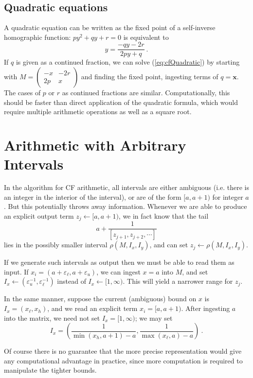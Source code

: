 \documentclass[11pt, oneside]{amsart}   	%
\renewcommand{\:}{\negthickspace:\negthickspace}
\begin{document}
\subsection{Quadratic equations}
A quadratic equation can be written as the fixed point of a self-inverse homographic function:
$
py^2 + qy + r = 0
$
is equivalent to
\begin{equation}\label{eq:cfQuadratic}
y = \frac{-qy - 2r}{2py + q}\ .
\end{equation}
If $q$ is given as a continued fraction, we can solve (\ref{eq:cfQuadratic}) by starting with $M= \left(
\begin{smallmatrix} 
-x & -2r \\ 
2p & x 
\end{smallmatrix}
\right)$ and finding the fixed point, ingesting terms of  $q=\mathbf{x}$. The cases of $p$ or $r$ as continued fractions are similar.
Computationally, this should be faster than direct application of the quadratic formula, which would require multiple arithmetic operations as well as a square root.


\section{Arithmetic with Arbitrary Intervals}
In the algorithm for CF arithmetic, all intervals are either ambiguous (i.e. there is an integer in the interior of the interval), or are of the form $[a,a+1)$ for integer $a$. But this potentially throws away information.
Whenever we are able to produce an explicit output term $z_j \leftarrow [a,a+1)$, we in fact know that the tail 
\[
a + \frac{1}{[z_{j+1}, z_{j+2},\cdots]}
\]
lies in the possibly smaller interval $\rho(M,I_x, I_y)$, and can set $z_j \leftarrow \rho(M,I_x, I_y)$.

If we generate such intervals as output then we must be able to read them as input. If $x_i = (a+\varepsilon_\ell, a+\varepsilon_u)$, we can ingest $x=a$ into $M$, and set $I_x \leftarrow (\varepsilon_u^{-1}, \varepsilon_\ell^{-1})$ instead of $I_x \leftarrow [1,\infty)$. This will yield a narrower range for $z_j$.

In the same manner, suppose the current (ambiguous) bound on $x$ is $I_x = (x_{\ell}, x_{h})$, and we read an explicit term $x_i = [a,a+1)$. After ingesting $a$ into the matrix, we need not set $I_x = [1,\infty)$; we may set
\[
I_x = \left(\frac{1}{\min(x_h,a+1) - a}, \frac{1}{\max(x_{\ell},a) - a}\right) \ .
\]

Of course there is no guarantee that the more precise representation would give any computational advantage in practice, since more computation is required to manipulate the tighter bounds.
\end{document}
